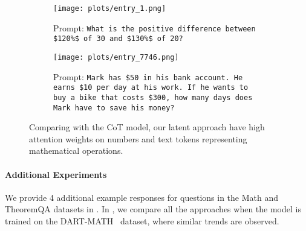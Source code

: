 \begin{figure}[t]
  \centering
  \begin{subfigure}[b]{\columnwidth}
       \texttt{[image: plots/entry\_1.png]}
  \caption{Prompt: \texttt{What is the positive difference between 
  \$120\%\$ of 30 and \$130\%\$ of 20?}}
  \label{fig:entry_1}
  \end{subfigure}

  \begin{subfigure}[b]{\columnwidth}
       \texttt{[image: plots/entry\_7746.png]}
  \caption{Prompt: \texttt{Mark has \$50 in his bank account. He earns \$10 per day at his work. If he wants to buy a bike that costs \$300, how many days does Mark have to save his money?}}
  \label{fig:entry_2}
  \end{subfigure}
  \caption{Comparing with the CoT model, our latent approach have high attention weights on numbers and text tokens representing mathematical operations.}
  \label{fig:attention}
\end{figure}
 

\paragraph{Additional Experiments} We provide 4 additional example responses for questions in the Math and TheoremQA datasets in . In , we compare all the approaches when the model is trained on the DART-MATH~\cite{tong2024dart} 
dataset, where similar trends are observed.
